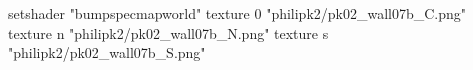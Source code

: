 setshader "bumpspecmapworld"
    texture 0 "philipk2/pk02_wall07b_C.png"
    texture n "philipk2/pk02_wall07b_N.png"
    texture s "philipk2/pk02_wall07b_S.png"